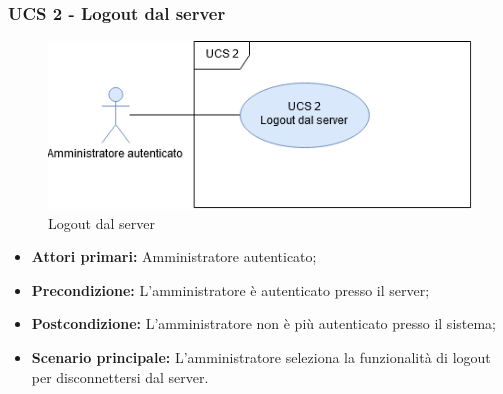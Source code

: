 \subsubsection{UCS 2 - Logout dal server}

\begin{figure}[h]
  \centering
  \includegraphics[scale=0.6]{sezioni/UseCase/Immagini/UCS2.png}
  \caption{Logout dal server}
\end{figure}

\begin{itemize}
\item \textbf{Attori primari:} Amministratore autenticato;
\item \textbf{Precondizione:} L'amministratore è autenticato presso il server;
\item \textbf{Postcondizione:}  L'amministratore non è più autenticato presso il sistema;
\item \textbf{Scenario principale:} L'amministratore seleziona la funzionalità di logout per disconnettersi dal server.
\end{itemize}
